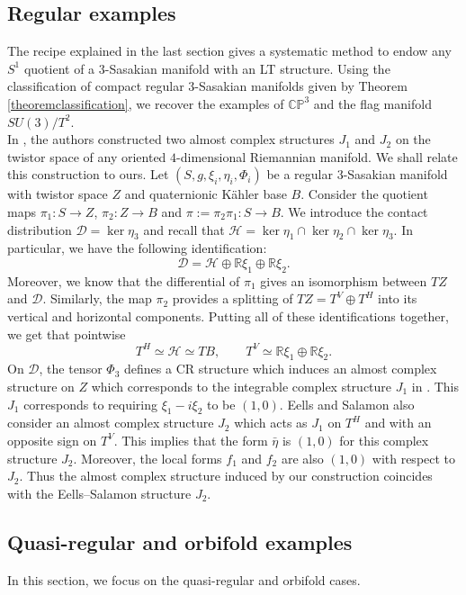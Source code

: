 \documentclass[12pt, reqno]{amsart}
\theoremstyle{definition}
\newcommand{\R}{\mathbb{R}}
\newcommand{\C}{\mathbb{C}}
\newcommand{\p}{\mathbb{P}}
\newcommand{\cH}{\mathcal{H}}
\newcommand{\cD}{\mathcal{D}}
\begin{document}
\subsection{Regular examples}\label{4.1}
The recipe explained in the last section gives a systematic method to endow any $S^1$ quotient of a $3$-Sasakian manifold with an LT structure. Using the classification of compact regular $3$-Sasakian manifolds given by Theorem \ref{theoremclassification}, we recover the examples of $\C\p^3$ and the flag manifold $SU(3)/T^2$.\\ 
\indent In \cite{EellsSalamon}, the authors constructed two almost complex structures $J_1$ and $J_2$ on the twistor space of any oriented $4$-dimensional Riemannian manifold. We shall relate this construction to ours. Let $(S,g,\xi_i,\eta_i,\Phi_i)$ be a regular $3$-Sasakian manifold with twistor space $Z$ and quaternionic Kähler base $B$. Consider the quotient maps $\pi_1 : S\to Z$, $\pi_2 : Z\to B$ and $\pi:=\pi_2\pi_1 : S\to B$. We introduce the contact distribution $\cD=\ker\eta_3$ and recall that $\cH=\ker\eta_1\cap\ker\eta_2\cap\ker\eta_3$. In particular, we have the following identification: $$\cD=\cH\oplus\R\xi_1\oplus\R\xi_2.$$ \indent Moreover, we know that the differential of $\pi_1$ gives an isomorphism between $TZ$ and $\cD$. Similarly, the map $\pi_2$ provides a splitting of $TZ=T^V\oplus T^H$ into its vertical and horizontal components. Putting all of these identifications together, we get that pointwise $$T^H\simeq\cH\simeq TB,\qquad T^V\simeq\R\xi_1\oplus\R\xi_2.$$\indent  On $\cD$, the tensor $\Phi_3$ defines a CR structure which induces an almost complex structure on $Z$ which corresponds to the integrable complex structure $J_1$ in \cite{EellsSalamon}. This $J_1$ corresponds to requiring $\xi_1-i\xi_2$ to be $(1,0)$. Eells and Salamon also consider an almost complex structure $J_2$ which acts as $J_1$ on $T^H$ and with an opposite sign on $T^V$. This implies that the form $\bar\eta$ is $(1,0)$ for this complex structure $J_2$. Moreover, the local forms $f_1$ and $f_2$ are also $(1,0)$ with respect to $J_2$. Thus the almost complex structure induced by our construction coincides with the Eells–Salamon structure $J_2$.
\subsection{Quasi-regular and orbifold examples}\label{4.2} In this section, we focus on the quasi-regular and orbifold cases. 
\end{document}
